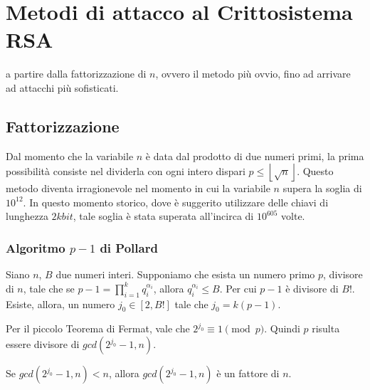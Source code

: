 
\chapter{Metodi di attacco al Crittosistema RSA}

 a partire dalla fattorizzazione di $n$, ovvero il metodo più ovvio, fino ad arrivare ad attacchi più sofisticati.

%
%
\section{Fattorizzazione}
%
%

Dal momento che la variabile $n$ è data dal prodotto di due numeri primi, la prima possibilità consiste nel dividerla con ogni intero dispari $p \leq \left\lfloor \sqrt{n} \right\rfloor$. Questo metodo diventa irragionevole nel momento in cui la variabile $n$ supera la soglia di $10^{12}$. In questo momento storico, dove è suggerito utilizzare delle chiavi di lunghezza $2kbit$, tale soglia è stata superata all'incirca di $10^{605}$ volte. %

%
\subsection{Algoritmo $p-1$ di Pollard}
%

Siano $n$, $B$ due numeri interi. Supponiamo che esista un numero primo $p$, divisore di $n$, tale che se $p-1 = \prod_{i=1}^{k} q_i^{\alpha_i}$, allora $q_i^{\alpha_i} \leq B$. Per cui $p-1$ è divisore di $B!$. Esiste, allora, un numero $j_0 \in [2, B!]$ tale che $j_0 = k(p-1)$.

Per il piccolo Teorema di Fermat, vale che $2^{j_0} \equiv 1 \pmod{p}$. Quindi $p$ risulta essere divisore di $gcd(2^{j_0} - 1, n)$.

Se $gcd(2^{j_0} - 1, n) < n$, allora $gcd(2^{j_0} - 1, n)$ è un fattore di $n$.

